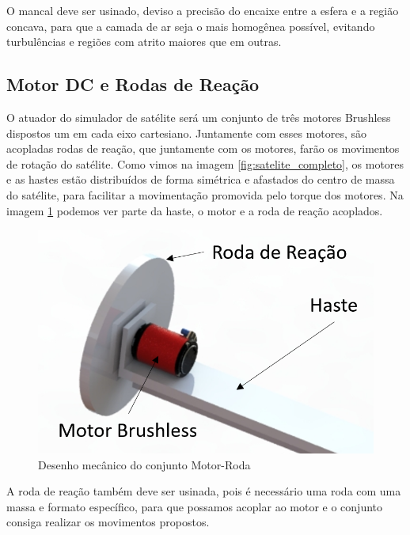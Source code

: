 O mancal deve ser usinado, deviso a precisão do encaixe entre a esfera e a região concava, para que a camada de ar seja o mais homogênea possível, evitando turbulências e regiões com atrito maiores que em outras. 

\subsection{Motor DC e Rodas de Reação}

O atuador do simulador de satélite será um conjunto de três motores Brushless dispostos um em cada eixo cartesiano. Juntamente com esses motores, são acopladas rodas de reação, que juntamente com os motores, farão os movimentos de rotação do satélite. Como vimos na imagem \ref{fig:satelite_completo}, os motores e as hastes estão distribuídos de forma simétrica e afastados do centro de massa do satélite, para facilitar a movimentação promovida pelo torque dos motores. Na imagem \ref{fig:motor_roda_desenho} podemos ver parte da haste, o motor e a roda de reação acoplados.

\begin{figure}[H]
  \caption{Desenho mecânico do conjunto Motor-Roda}
  \begin{center}
      \includegraphics[scale=.45]{img/motor_roda_desenho}
  \end{center}
  \label{fig:motor_roda_desenho}
\end{figure}

A roda de reação também deve ser usinada, pois é necessário uma roda com uma massa e formato específico, para que possamos acoplar ao motor e o conjunto consiga realizar os movimentos propostos. 

